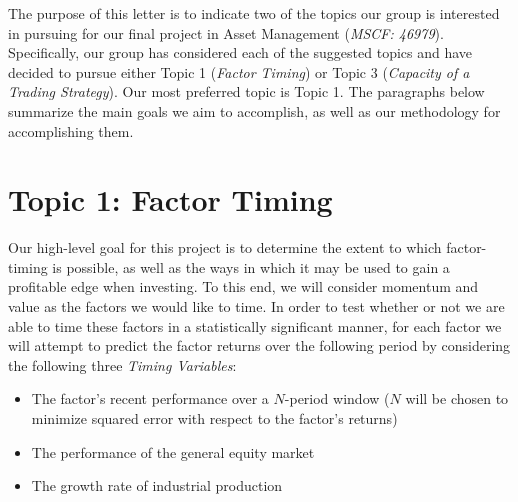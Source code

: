 \documentclass[12pt]{article}
\begin{document}
\maketitle

The purpose of this letter is to indicate two of the topics our group is interested in pursuing for our final project in Asset Management (\textit{MSCF: 46979}). Specifically, our group has considered each of the suggested topics and have decided to pursue either Topic 1 (\textit{Factor Timing}) or Topic 3 (\textit{Capacity of a Trading Strategy}). Our most preferred topic is Topic 1. The paragraphs below summarize the main goals we aim to accomplish, as well as our methodology for accomplishing them.

\section{Topic 1: Factor Timing}

Our high-level goal for this project is to determine the extent to which factor-timing is possible, as well as the ways in which it may be used to gain a profitable edge when investing. To this end, we will consider momentum and value as the factors we would like to time. In order to test whether or not we are able to time these factors in a statistically significant manner, for each factor we will attempt to predict the factor returns over the following period by considering the following three \textit{Timing Variables}:

\begin{itemize}
  \item The factor's recent performance over a $N$-period window ($N$ will be chosen to minimize squared error with respect to the factor's returns)
  \item The performance of the general equity market
  \item The growth rate of industrial production
\end{itemize}
\end{document}
